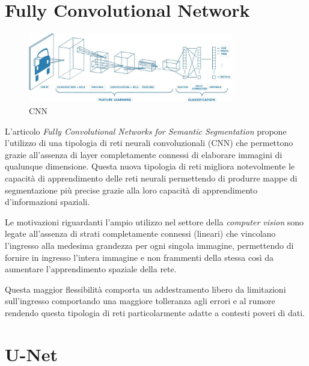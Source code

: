 \section{Fully Convolutional Network} 
\begin{figure}[h!]
  \begin{center}
    \includegraphics[width=0.8\textwidth]{Immagini/cnn.png}
  \end{center}
  \caption{CNN}
  \label{fig:cnn}
\end{figure}



\label{sec:fcn} L'articolo \textit{Fully
Convolutional Networks for Semantic Segmentation} \cite{long2015fully} propone
l'utilizzo di una tipologia di reti neurali convoluzionali (CNN) che permettono
grazie all'assenza di layer completamente connessi di elaborare immagini di
qualunque dimensione. Questa nuova tipologia di reti migliora notevolmente le capacità di apprendimento delle reti neurali permettendo di produrre mappe
di segmentazione più precise grazie alla loro capacità di apprendimento d'informazioni spaziali.

Le motivazioni riguardanti l'ampio utilizzo nel settore della
\textit{computer vision} sono legate all'assenza di strati completamente
connessi (lineari) che vincolano l'ingresso alla medesima grandezza per ogni
singola immagine, permettendo di fornire in ingresso l'intera immagine e non
frammenti della stessa così da aumentare l'apprendimento spaziale della rete.

Questa maggior flessibilità comporta un addestramento libero da limitazioni
sull'ingresso comportando una maggiore tolleranza agli errori e al rumore
rendendo questa tipologia di reti particolarmente adatte a contesti poveri di
dati.




\section{U-Net} \label{sec:unet} 

